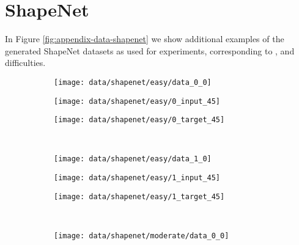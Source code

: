 \FloatBarrier
\newpage
\section{ShapeNet}
\label{sec:appendix-data-shapenet}

In Figure \ref{fig:appendix-data-shapenet} we show additional examples of the
generated ShapeNet \cite{ChangFunkhouserGuibasSavarese:2015}
datasets as used for experiments, \ie corresponding to
\easy, \moderate and \hard difficulties.

\begin{figure}[h]
  \centering 
  \begin{subfigure}[t]{0.425\textwidth}
    \vspace{0px}
    \texttt{[image: data/shapenet/easy/data\_0\_0]}
  \end{subfigure}
  \begin{subfigure}[t]{0.2\textwidth}
    \vspace{0px}
    \texttt{[image: data/shapenet/easy/0\_input\_45]}
  \end{subfigure}
  \begin{subfigure}[t]{0.2\textwidth}
    \vspace{0px}
    \texttt{[image: data/shapenet/easy/0\_target\_45]}
  \end{subfigure}\\[2px]
  \begin{subfigure}[t]{0.425\textwidth}
    \vspace{0px}
    \texttt{[image: data/shapenet/easy/data\_1\_0]}
  \end{subfigure}
  \begin{subfigure}[t]{0.2\textwidth}
    \vspace{0px}
    \texttt{[image: data/shapenet/easy/1\_input\_45]}
  \end{subfigure}
  \begin{subfigure}[t]{0.2\textwidth}
    \vspace{0px}
    \texttt{[image: data/shapenet/easy/1\_target\_45]}
  \end{subfigure}\\[2px]
  \begin{subfigure}[t]{0.425\textwidth}
    \vspace{0px}
    \texttt{[image: data/shapenet/moderate/data\_0\_0]}

\end{subfigure}
\end{figure}
